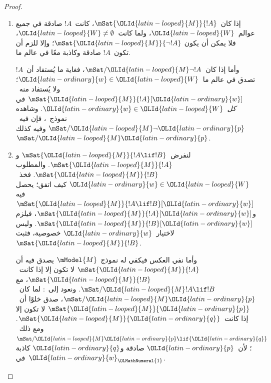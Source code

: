 \documentclass[../../../include/open-logic-section]{subfiles}
\begin{document}
\begin{proof}
  \begin{enumerate}
  \item إذا كان~$\mSat{{\OLId{latin-looped}{M}}}{!A}$، كانت~$!A$ صادقة في جميع عوالم~${\OLId{latin-looped}{W}}$،
    ولما كانت~${\OLId{latin-looped}{W}} \neq \emptyset$، فلا يمكن أن يكون
    $\mSat{{\OLId{latin-looped}{M}}}{\lnot!A}$؛ وإلا للزم أن تكون~$!A$ صادقة وكاذبة معًا في
    عالم ما.

    وأما إذا كان~$\mSat/{{\OLId{latin-looped}{M}}}{\lnot !A}$، فغاية ما يُستفاد أن~$!A$
    تصدق في عالم ما~${\OLId{latin-ordinary}{w}} \in {\OLId{latin-looped}{W}}$؛ ولا يُستفاد منه~$\mSat{{\OLId{latin-looped}{M}}}{!A}[{\OLId{latin-ordinary}{w}}]$
    في \emph{كل}~${\OLId{latin-ordinary}{w}} \in {\OLId{latin-looped}{W}}$. وشاهده نموذج~،
    فإن فيه~$\mSat/{{\OLId{latin-looped}{M}}}{\lnot {\OLId{latin-ordinary}{p}}}$ وفيه كذلك~$\mSat/{{\OLId{latin-looped}{M}}}{{\OLId{latin-ordinary}{p}}}$.
  \item لنفرض~$\mSat{{\OLId{latin-looped}{M}}}{!A \lif !B}$ و$\mSat{{\OLId{latin-looped}{M}}}{!A}$. والمطلوب
    $\mSat{{\OLId{latin-looped}{M}}}{!B}$. فخذ~${\OLId{latin-ordinary}{w}} \in {\OLId{latin-looped}{W}}$ كيف اتفق؛ يحصل فيه
    $\mSat{{\OLId{latin-looped}{M}}}{!A \lif !B}[{\OLId{latin-ordinary}{w}}]$ و$\mSat{{\OLId{latin-looped}{M}}}{!A}[{\OLId{latin-ordinary}{w}}]$، فيلزم
    $\mSat{{\OLId{latin-looped}{M}}}{!B}[{\OLId{latin-ordinary}{w}}]$. وليس لاختيار~${\OLId{latin-ordinary}{w}}$ خصوصية، فثبت
    $\mSat{{\OLId{latin-looped}{M}}}{!B}$.

    وأما نفي العكس فيكفي له نموذج~$\mModel{M}$ يصدق فيه أن
    $\mSat{{\OLId{latin-looped}{M}}}{!A}$ لا تكون إلا إذا كانت~$\mSat{{\OLId{latin-looped}{M}}}{!B}$، مع
    $\mSat/{{\OLId{latin-looped}{M}}}{!A \lif !B}$. ونعود إلى~:
    لما كان~$\mSat/{{\OLId{latin-looped}{M}}}{{\OLId{latin-ordinary}{p}}}$، صدق خلوًا أن~$\mSat{{\OLId{latin-looped}{M}}}{{\OLId{latin-ordinary}{p}}}$ لا تكون
    إلا إذا كانت~$\mSat{{\OLId{latin-looped}{M}}}{{\OLId{latin-ordinary}{q}}}$. ومع ذلك~$\mSat/{{\OLId{latin-looped}{M}}}{{\OLId{latin-ordinary}{p}} \lif {\OLId{latin-ordinary}{q}}}$؛
    لأن~${\OLId{latin-ordinary}{p}}$ صادقة و${\OLId{latin-ordinary}{q}}$ كاذبة في~${\OLId{latin-ordinary}{w}}_{\OLMathNumeral{1}}$.
  \end{enumerate}
\end{proof}
\end{document}
